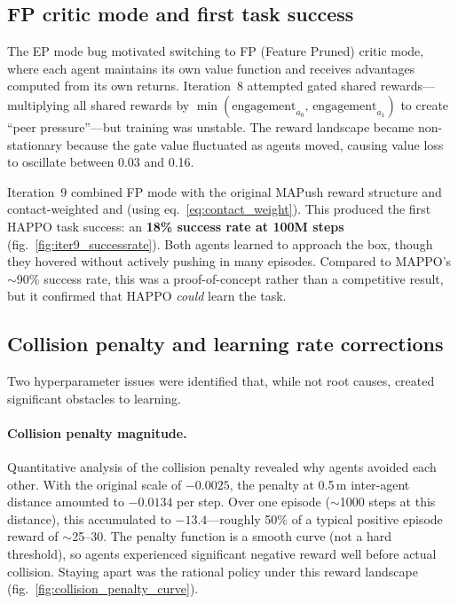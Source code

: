 
\subsection{FP critic mode and first task success}
\label{sec:fp_mode}

The EP mode bug motivated switching to FP (Feature Pruned) critic mode, where each agent maintains its own value function and receives advantages computed from its own returns. Iteration~8 attempted gated shared rewards---multiplying all shared rewards by $\min(\text{engagement}_{a_0},\, \text{engagement}_{a_1})$ to create ``peer pressure''---but training was unstable. The reward landscape became non-stationary because the gate value fluctuated as agents moved, causing value loss to oscillate between 0.03 and 0.16.

Iteration~9 combined FP mode with the original MAPush reward structure and contact-weighted  and  (using eq.~\ref{eq:contact_weight}). This produced the first HAPPO task success: an \textbf{18\% success rate at 100M steps} (fig.~\ref{fig:iter9_successrate}). Both agents learned to approach the box, though they hovered without actively pushing in many episodes. Compared to MAPPO's $\sim$90\% success rate, this was a proof-of-concept rather than a competitive result, but it confirmed that HAPPO \emph{could} learn the task.


\subsection{Collision penalty and learning rate corrections}
\label{sec:collision_lr}

Two hyperparameter issues were identified that, while not root causes, created significant obstacles to learning.

\paragraph{Collision penalty magnitude.}
Quantitative analysis of the collision penalty revealed why agents avoided each other. With the original scale of $-0.0025$, the penalty at 0.5\,m inter-agent distance amounted to $-0.0134$ per step. Over one episode ($\sim$1000 steps at this distance), this accumulated to $-13.4$---roughly 50\% of a typical positive episode reward of $\sim$25--30. The penalty function is a smooth curve (not a hard threshold), so agents experienced significant negative reward well before actual collision. Staying apart was the rational policy under this reward landscape (fig.~\ref{fig:collision_penalty_curve}).

